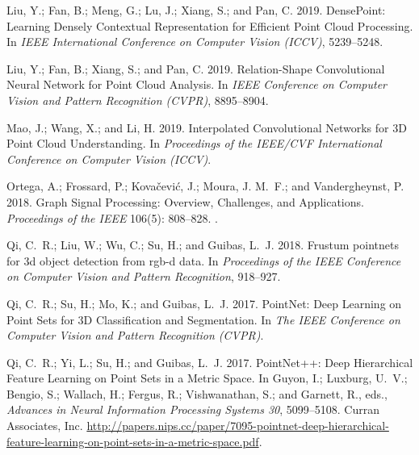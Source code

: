 \documentclass[letterpaper]{article} \usepackage{aaai21}  \usepackage{times}  \usepackage{helvet} \usepackage{courier}  \usepackage[hyphens]{url}  \usepackage{graphicx} \urlstyle{rm} \def\UrlFont{\rm}  \usepackage{natbib}  \usepackage{caption} \frenchspacing  \setlength{\pdfpagewidth}{8.5in}  \setlength{\pdfpageheight}{11in}  \usepackage{color}
\begin{document}
{\begin{thebibliography}{38}
Liu, Y.; Fan, B.; Meng, G.; Lu, J.; Xiang, S.; and Pan, C. 2019{}.
\newblock DensePoint: Learning Densely Contextual Representation for Efficient
  Point Cloud Processing.
\newblock In \emph{IEEE International Conference on Computer Vision (ICCV)},
  5239--5248.

Liu, Y.; Fan, B.; Xiang, S.; and Pan, C. 2019{}.
\newblock Relation-Shape Convolutional Neural Network for Point Cloud Analysis.
\newblock In \emph{IEEE Conference on Computer Vision and Pattern Recognition
  (CVPR)}, 8895--8904.

Mao, J.; Wang, X.; and Li, H. 2019.
\newblock Interpolated Convolutional Networks for 3D Point Cloud Understanding.
\newblock In \emph{Proceedings of the IEEE/CVF International Conference on
  Computer Vision (ICCV)}.

{Ortega}, A.; {Frossard}, P.; {Kovačević}, J.; {Moura}, J. M.~F.; and
  {Vandergheynst}, P. 2018.
\newblock Graph Signal Processing: Overview, Challenges, and Applications.
\newblock \emph{Proceedings of the IEEE} 106(5): 808--828.
\newblock {}.

Qi, C.~R.; Liu, W.; Wu, C.; Su, H.; and Guibas, L.~J. 2018.
\newblock Frustum pointnets for 3d object detection from rgb-d data.
\newblock In \emph{Proceedings of the IEEE Conference on Computer Vision and
  Pattern Recognition}, 918--927.

Qi, C.~R.; Su, H.; Mo, K.; and Guibas, L.~J. 2017{}.
\newblock PointNet: Deep Learning on Point Sets for 3D Classification and
  Segmentation.
\newblock In \emph{The IEEE Conference on Computer Vision and Pattern
  Recognition (CVPR)}.

Qi, C.~R.; Yi, L.; Su, H.; and Guibas, L.~J. 2017{}.
\newblock PointNet++: Deep Hierarchical Feature Learning on Point Sets in a
  Metric Space.
\newblock In Guyon, I.; Luxburg, U.~V.; Bengio, S.; Wallach, H.; Fergus, R.;
  Vishwanathan, S.; and Garnett, R., eds., \emph{Advances in Neural Information
  Processing Systems 30}, 5099--5108. Curran Associates, Inc.
\newblock
  \urlprefix\url{http://papers.nips.cc/paper/7095-pointnet-deep-hierarchical-feature-learning-on-point-sets-in-a-metric-space.pdf}.


\end{thebibliography}}
\end{document}
